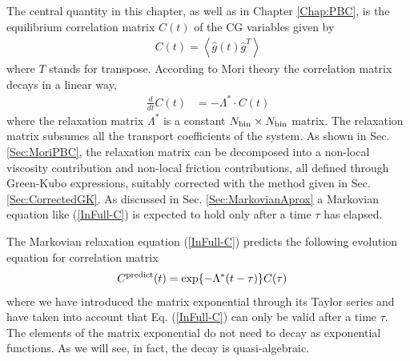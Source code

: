 \documentclass[b5paper,openright,11pt]{book}
\newcommand{\esc}{\!\cdot\!}
\newcommand{\llangle}{\left\langle}
\newcommand{\rrangle}{\right\rangle}
\begin{document}
The central quantity in this chapter, as well as in Chapter \ref{Chap:PBC}, is the equilibrium correlation matrix $C(t)$ of the CG variables given by
\begin{align}
  C(t)=\llangle \hat{g}(t) \hat{g}^T\rrangle
\end{align}
where  $T$  stands  for  transpose.   According  to  Mori  theory  the
correlation matrix decays in a linear way,
\begin{align}
 \frac{d}{dt}C(t)&= -\Lambda^*\esc C(t)
\label{InFull-C}
\end{align}
where  the  relaxation  matrix   $\Lambda^*$  is  a  constant  $N_{\rm
  bin}\times N_{\rm  bin}$ matrix. The relaxation  matrix subsumes all
  the transport coefficients  of the system. As shown  in Sec. \ref{Sec:MoriPBC},
the relaxation  matrix can  be decomposed  into a  non-local viscosity
contribution and non-local friction contributions, all defined through
Green-Kubo expressions,  suitably corrected  with the method  given in
Sec. \ref{Sec:CorrectedGK}.  As discussed in  Sec.  \ref{Sec:MarkovianAprox} a  Markovian equation
like (\ref{InFull-C}) is expected to hold only after a time $\tau$ has
elapsed. 

The Markovian relaxation equation (\ref{InFull-C}) predicts the following
evolution equation for correlation matrix
\begin{align}
  C^{\rm predict}(t)&=\exp\{-\Lambda^* (t-\tau)\}C(\tau)
\label{Cpredict}
\end{align}
where we  have introduced  the matrix  exponential through  its Taylor
series and have taken into account that Eq.  (\ref{InFull-C}) can only
be valid after  a time $\tau$. The elements of  the matrix exponential
do not  need to  decay as  exponential functions. As  we will  see, in
fact,  the decay  is  quasi-algebraic.   
\end{document}
